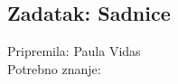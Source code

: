  \subsection*{Zadatak: Sadnice}
  \textsf{Pripremila: Paula Vidas}\\
  \textsf{Potrebno znanje: }\\

